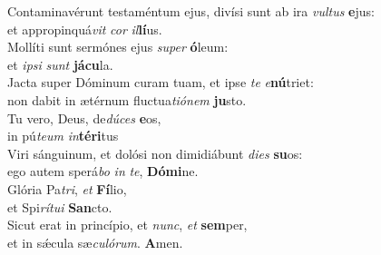 \oddverse Contaminavérunt testaméntum ejus, divísi sunt ab ira \textit{vul}\textit{tus} \textbf{e}jus:~\*\\
\oddverse et appropinquá\textit{vit} \textit{cor} \textit{il}\textbf{lí}us.\\
\evenverse Mollíti sunt sermónes ejus \textit{su}\textit{per} \textbf{ó}leum:~\*\\
\evenverse et \textit{i}\textit{psi} \textit{sunt} \textbf{já}\textbf{cu}la.\\
\oddverse Jacta super Dóminum curam tuam, et ipse \textit{te} \textit{e}\textbf{nú}triet:~\*\\
\oddverse non dabit in ætérnum fluctua\textit{ti}\textit{ó}\textit{nem} \textbf{ju}sto.\\
\evenverse Tu vero, Deus, de\textit{dú}\textit{ces} \textbf{e}os,~\*\\
\evenverse in pú\textit{te}\textit{um} \textit{in}\textbf{té}\textbf{ri}tus\\
\oddverse Viri sánguinum, et dolósi non dimidiábunt \textit{di}\textit{es} \textbf{su}os:~\*\\
\oddverse ego autem sperá\textit{bo} \textit{in} \textit{te}, \textbf{Dó}\textbf{mi}ne.\\
\evenverse Glória Pa\textit{tri}, \textit{et} \textbf{Fí}lio,~\*\\
\evenverse et Spi\textit{rí}\textit{tu}\textit{i} \textbf{San}cto.\\
\oddverse Sicut erat in princípio, et \textit{nunc}, \textit{et} \textbf{sem}per,~\*\\
\oddverse et in sǽcula sæ\textit{cu}\textit{ló}\textit{rum}. \textbf{A}men.\\

